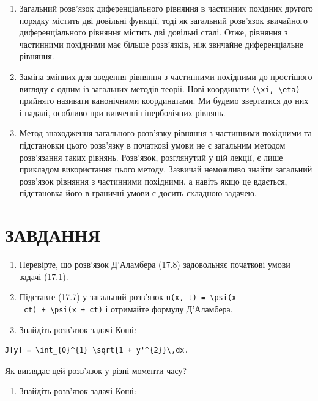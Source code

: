 \documentclass[
  ukrainian,
]{article}
\providecommand{\tightlist}{%
  \setlength{\itemsep}{0pt}\setlength{\parskip}{0pt}}
\begin{document}
\begin{enumerate}
\def\labelenumi{\arabic{enumi}.}
\item
  Загальний розв'язок диференціального рівняння в частинних похідних
  другого порядку містить дві довільні функції, тоді як загальний
  розв'язок звичайного диференціального рівняння містить дві довільні
  сталі. Отже, рівняння з частинними похідними має більше розв'язків,
  ніж звичайне диференціальне рівняння.
\item
  Заміна змінних для зведення рівняння з частинними похідними до
  простішого вигляду є одним із загальних методів теорії. Нові
  координати \texttt{(\textbackslash{}xi,\ \textbackslash{}eta)}
  прийнято називати канонічними координатами. Ми будемо звертатися до
  них і надалі, особливо при вивченні гіперболічних рівнянь.
\item
  Метод знаходження загального розв'язку рівняння з частинними похідними
  та підстановки цього розв'язку в початкові умови не є загальним
  методом розв'язання таких рівнянь. Розв'язок, розглянутий у цій
  лекції, є лише прикладом використання цього методу. Зазвичай неможливо
  знайти загальний розв'язок рівняння з частинними похідними, а навіть
  якщо це вдається, підстановка його в граничні умови є досить складною
  задачею.
\end{enumerate}

\section{ЗАВДАННЯ}\label{ux437ux430ux432ux434ux430ux43dux43dux44f-2}

\begin{enumerate}
\def\labelenumi{\arabic{enumi}.}
\item
  Перевірте, що розв'язок Д'Аламбера (17.8) задовольняє початкові умови
  задачі (17.1).
\item
  Підставте (17.7) у загальний розв'язок
  \texttt{u(x,\ t)\ =\ \textbackslash{}psi(x\ -\ ct)\ +\ \textbackslash{}psi(x\ +\ ct)}
  і отримайте формулу Д'Аламбера.
\item
  Знайдіть розв'язок задачі Коші:
\end{enumerate}

\begin{verbatim}
J[y] = \int_{0}^{1} \sqrt{1 + y'^{2}}\,dx.
\end{verbatim}

Як виглядає цей розв'язок у різні моменти часу?

\begin{enumerate}
\def\labelenumi{\arabic{enumi}.}
\setcounter{enumi}{3}
\tightlist
\item
  Знайдіть розв'язок задачі Коші:
\end{enumerate}
\end{document}
